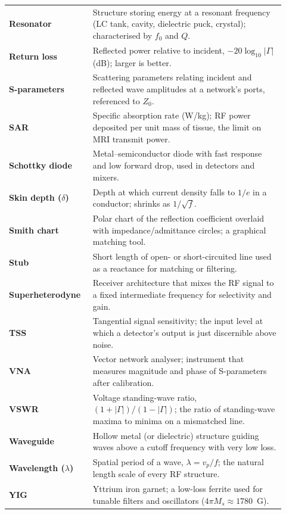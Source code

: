 \begin{longtable}{>{\raggedright\arraybackslash}p{0.26\linewidth}>{\raggedright\arraybackslash}p{0.66\linewidth}}
\textbf{Resonator} & Structure storing energy at a resonant frequency (LC tank, cavity, dielectric puck, crystal); characterised by $f_0$ and $Q$. \\
\textbf{Return loss} & Reflected power relative to incident, $-20\log_{10}|\Gamma|$ (dB); larger is better. \\
\textbf{S-parameters} & Scattering parameters relating incident and reflected wave amplitudes at a network's ports, referenced to $Z_0$. \\
\textbf{SAR} & Specific absorption rate (W/kg); RF power deposited per unit mass of tissue, the limit on MRI transmit power. \\
\textbf{Schottky diode} & Metal--semiconductor diode with fast response and low forward drop, used in detectors and mixers. \\
\textbf{Skin depth ($\delta$)} & Depth at which current density falls to $1/e$ in a conductor; shrinks as $1/\sqrt{f}$. \\
\textbf{Smith chart} & Polar chart of the reflection coefficient overlaid with impedance/admittance circles; a graphical matching tool. \\
\textbf{Stub} & Short length of open- or short-circuited line used as a reactance for matching or filtering. \\
\textbf{Superheterodyne} & Receiver architecture that mixes the RF signal to a fixed intermediate frequency for selectivity and gain. \\
\textbf{TSS} & Tangential signal sensitivity; the input level at which a detector's output is just discernible above noise. \\
\textbf{VNA} & Vector network analyser; instrument that measures magnitude and phase of S-parameters after calibration. \\
\textbf{VSWR} & Voltage standing-wave ratio, $(1+|\Gamma|)/(1-|\Gamma|)$; the ratio of standing-wave maxima to minima on a mismatched line. \\
\textbf{Waveguide} & Hollow metal (or dielectric) structure guiding waves above a cutoff frequency with very low loss. \\
\textbf{Wavelength ($\lambda$)} & Spatial period of a wave, $\lambda=v_p/f$; the natural length scale of every RF structure. \\
\textbf{YIG} & Yttrium iron garnet; a low-loss ferrite used for tunable filters and oscillators ($4\pi M_s\approx1780$~G). \\
\hline
\end{longtable}
